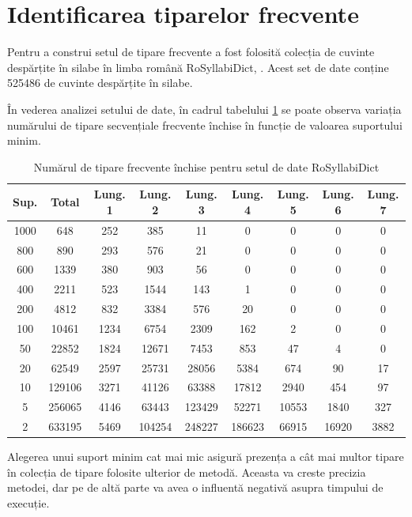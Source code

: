 \section{Identificarea tiparelor frecvente}

Pentru a construi setul de tipare frecvente a fost folosită colecția de cuvinte despărțite în silabe în limba română RoSyllabiDict, \cite{bib:BARBU08.495}. Acest set de date conține 525486 de cuvinte despărțite în silabe. 

În vederea analizei setului de date, în cadrul tabelului \ref{table:sdb_counts} se poate observa variația numărului de tipare secvențiale frecvente închise în funcție de valoarea suportului minim.   

\begin{table}[h!]
\centering
\begin{tabular}{|c|c|c|c|c|c|c|c|c|}
\hline
Sup.& Total & Lung. 1 & Lung. 2 & Lung. 3 & Lung. 4 & Lung. 5 & Lung. 6 & Lung. 7\\ 
\hline
\hline
1000 & 648 & 252 & 385 & 11 & 0 & 0 & 0 & 0\\ 
\hline
800 & 890 & 293 & 576 & 21 & 0 & 0 & 0 & 0\\ 
\hline
600 & 1339 & 380 & 903 & 56 & 0 & 0 & 0 & 0\\ 
\hline
400 & 2211 & 523 & 1544 & 143 & 1 & 0 & 0 & 0\\ 
\hline
200 & 4812 & 832 & 3384 & 576 & 20 & 0 & 0 & 0\\ 
\hline
100 & 10461 & 1234 & 6754 & 2309 & 162 & 2 & 0 & 0\\ 
\hline
50 & 22852 & 1824 & 12671 & 7453 & 853 & 47 & 4 & 0\\ 
\hline
20 & 62549 & 2597 & 25731 & 28056 & 5384 & 674 & 90 & 17\\ 
\hline
10 & 129106 & 3271 & 41126 & 63388 & 17812 & 2940 & 454 & 97\\ 
\hline
5 & 256065 & 4146 & 63443 & 123429 & 52271 & 10553 & 1840 & 327\\ 
\hline
2 & 633195 & 5469 & 104254 & 248227 & 186623 & 66915 & 16920 & 3882\\ 
\hline\end{tabular}
\label{table:sdb_counts}
\caption{Numărul de tipare frecvente închise pentru setul de date RoSyllabiDict} 
\end{table}

Alegerea unui suport minim cat mai mic asigură prezența a cât mai multor tipare în colecția de tipare folosite ulterior de metodă. Aceasta va creste precizia metodei, dar pe de altă parte va avea o influentă negativă asupra timpului de execuție. 

